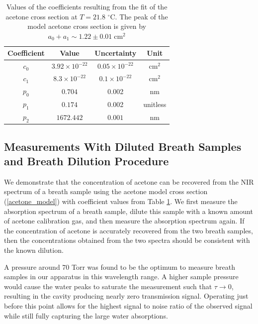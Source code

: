 \documentclass[8pt,a4paper]{report}
\begin{document}
	\begin{table}[H]
		\begin{center}
			\caption{ Values of the coefficients resulting from the fit of the acetone cross section at $T=21.8$ $^\circ$C. The peak of the model acetone cross section is given by $a_0 + a_1 \sim 1.22 \pm 0.01\;\mathrm{cm}^2$}\label{table:acetone_coeffs}
			\begin{tabular}{|c|c|c|c|}
				\hline
				\textbf{Coefficient} & \textbf{Value} & \textbf{Uncertainty} & \textbf{Unit} \\
				\hline
				$c_0$ & $3.92\times10^{-22}$ & $0.05\times10^{-22}$ & $\mathrm{cm}^2$ \\
				\hline
				$c_1$ & $8.3\times10^{-22}$ & $0.1\times10^{-22}$ & $\mathrm{cm^2}$ \\
				\hline
				$p_0$ & $0.704$ & 0.002 & nm \\
				\hline
				$p_1$ & $0.174$ & 0.002 & unitless \\
				\hline
				$p_2$ & $1672.442$ & $0.001$ & nm \\
				\hline
			\end{tabular}
		\end{center}
	\end{table}
	
	\subsection{Measurements With Diluted Breath Samples and Breath Dilution Procedure} \label{sec:breath_dilution}
	
	We demonstrate that the concentration of acetone can be recovered from the NIR spectrum of a breath sample using the acetone model cross section (\ref{acetone_model}) with coefficient values from Table \ref{table:acetone_coeffs}. We first measure the absorption spectrum of a breath sample, dilute this sample with a known amount of acetone calibration gas, and then measure the absorption spectrum again. If the concentration of acetone is accurately recovered from the two breath samples, then the concentrations obtained from the two spectra should be consistent with the known dilution.
	
	A pressure around 70 Torr was found to be the optimum to measure breath samples in our apparatus in this wavelength range. A higher sample pressure would cause the water peaks to saturate the measurement such that $\tau \rightarrow 0$, resulting in the cavity producing nearly zero transmission signal. Operating just before this point allows for the highest signal to noise ratio of the observed signal while still fully capturing the large water absorptions.
	
\end{document}

